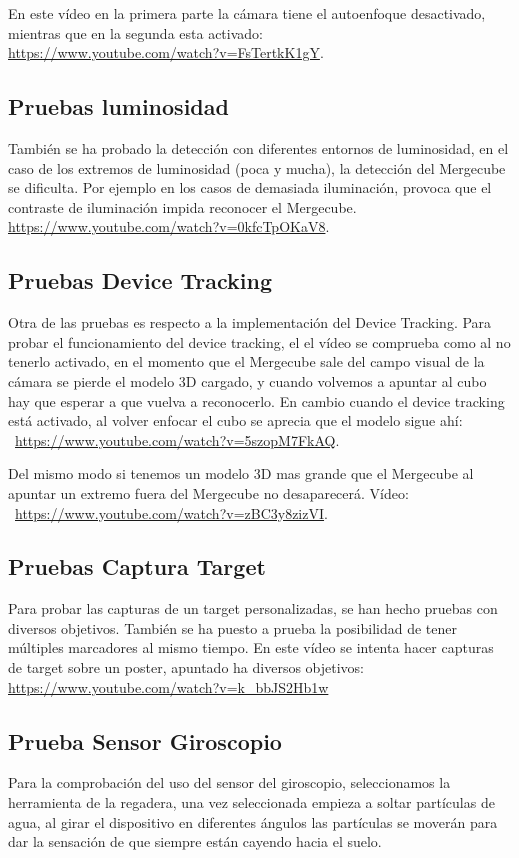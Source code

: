 En este vídeo en la primera parte la cámara tiene el autoenfoque desactivado, mientras que en la segunda esta activado:\\ \url{https://www.youtube.com/watch?v=FsTertkK1gY}.



\subsection{Pruebas luminosidad}
También se ha probado la detección con diferentes entornos de luminosidad, en el caso de los extremos de luminosidad (poca y mucha), la detección del Mergecube se dificulta. Por ejemplo en los casos de demasiada iluminación, provoca que el contraste de iluminación impida reconocer el Mergecube. 
\url{https://www.youtube.com/watch?v=0kfcTpOKaV8}.

\subsection{Pruebas Device Tracking}
Otra de las pruebas es respecto a la implementación del Device Tracking. Para probar el funcionamiento del device tracking, el el vídeo se comprueba como al no tenerlo activado, en el momento que el Mergecube sale del campo visual de la cámara se pierde el modelo 3D cargado, y cuando volvemos a apuntar al cubo hay que esperar a que vuelva a reconocerlo. En cambio cuando el device tracking está activado, al volver enfocar el cubo se aprecia que el modelo sigue ahí:\\~\url{https://www.youtube.com/watch?v=5szopM7FkAQ}.

Del mismo modo si tenemos un modelo 3D mas grande que el Mergecube al apuntar un extremo fuera del Mergecube no desaparecerá. Vídeo:\\~\url{https://www.youtube.com/watch?v=zBC3y8zizVI}.

\subsection{Pruebas Captura Target}
Para probar las capturas de un target personalizadas, se han hecho pruebas con diversos objetivos. También se ha puesto a prueba la posibilidad de tener múltiples marcadores al mismo tiempo. En este vídeo se intenta hacer capturas de target sobre un poster, apuntado ha diversos objetivos: \url{https://www.youtube.com/watch?v=k_bbJS2Hb1w}	


\subsection{Prueba Sensor Giroscopio}
Para la comprobación del uso del sensor del giroscopio, seleccionamos la herramienta de la regadera, una vez seleccionada empieza a soltar partículas de agua, al girar el dispositivo en diferentes ángulos las partículas se moverán para dar la sensación de que siempre están cayendo hacia el suelo. 

